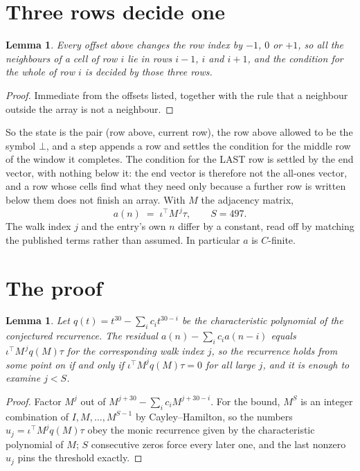 \documentclass[11pt,a4paper]{article}
\theoremstyle{plain}
\newtheorem{lemma}[theorem]{Lemma}
\theoremstyle{definition}
\begin{document}
\section{Three rows decide one}

\begin{lemma}\label{lem:win}
Every offset above changes the row index by $-1$, $0$ or $+1$, so all the neighbours of a cell
of row $i$ lie in rows $i-1$, $i$ and $i+1$, and the condition for the whole of row $i$ is
decided by those three rows.
\end{lemma}

\begin{proof}
Immediate from the offsets listed, together with the rule that a neighbour outside the array is
not a neighbour.
\end{proof}

So the state is the pair (row above, current row), the row above allowed to be the symbol
$\bot$, and a step appends a row and settles the condition for the middle row of the window it
completes. The condition for the LAST row is settled by the end vector, with nothing below it:
the end vector is therefore not the all-ones vector, and a row whose cells find what they need
only because a further row is written below them does not finish an array. With $M$ the
adjacency matrix,
\[
a(n)\;=\;\iota^{\!\top}M^{\,j}\tau ,\qquad S=497.
\]
The walk index $j$ and the entry's own $n$ differ by a constant, read off by matching the
published terms rather than assumed. In particular $a$ is $C$-finite.

\section{The proof}

\begin{lemma}\label{lem:crit}
Let $q(t)=t^{30}-\sum_i c_it^{30-i}$ be the characteristic polynomial of the
conjectured recurrence. The residual $a(n)-\sum_ic_ia(n-i)$ equals
$\iota^{\!\top}M^{\,j}q(M)\tau$ for the corresponding walk index $j$, so the recurrence
holds from some point on if and only if $\iota^{\!\top}M^{j}q(M)\tau=0$ for all large $j$,
and it is enough to examine $j<S$.
\end{lemma}

\begin{proof}
Factor $M^{j}$ out of $M^{j+30}-\sum_ic_iM^{j+30-i}$. For the bound, $M^{S}$
is an integer combination of $I,M,\dots,M^{S-1}$ by Cayley--Hamilton, so the numbers
$u_j=\iota^{\!\top}M^{j}q(M)\tau$ obey the monic recurrence given by the characteristic
polynomial of $M$; $S$ consecutive zeros force every later one, and the last nonzero $u_j$
pins the threshold exactly.
\end{proof}
\end{document}
